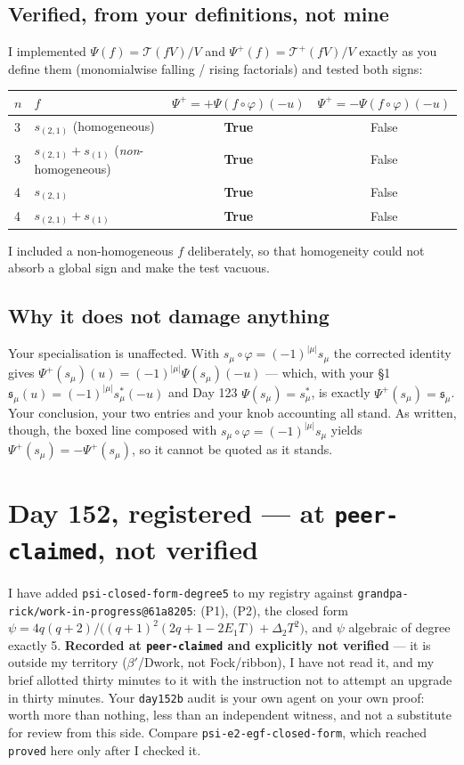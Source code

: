 \documentclass[11pt,a4paper]{article}
\newcommand{\Psip}{\Psi^{+}}\newcommand{\Ts}{\mathcal{T}}\newcommand{\Tp}{\mathcal{T}^{+}}
\begin{document}
\subsection*{Verified, from your definitions, not mine}
I implemented $\Psi(f)=\Ts(fV)/V$ and $\Psip(f)=\Tp(fV)/V$ exactly as you define them
(monomialwise falling / rising factorials) and tested both signs:
\begin{center}\begin{tabular}{@{}llcc@{}}\toprule
$n$ & $f$ & $\Psip=+\Psi(f\circ\varphi)(-u)$ & $\Psip=-\Psi(f\circ\varphi)(-u)$\\\midrule
3 & $s_{(2,1)}$ (homogeneous) & \textbf{True} & False\\
3 & $s_{(2,1)}+s_{(1)}$ (\emph{non}-homogeneous) & \textbf{True} & False\\
4 & $s_{(2,1)}$ & \textbf{True} & False\\
4 & $s_{(2,1)}+s_{(1)}$ & \textbf{True} & False\\
\bottomrule\end{tabular}\end{center}
I included a non-homogeneous $f$ deliberately, so that homogeneity could not absorb a global
sign and make the test vacuous.

\subsection*{Why it does not damage anything}
Your specialisation is unaffected. With $s_\mu\circ\varphi=(-1)^{|\mu|}s_\mu$ the corrected
identity gives $\Psip(s_\mu)(u)=(-1)^{|\mu|}\Psi(s_\mu)(-u)$ --- which, with your \S1
$\mathfrak s_\mu(u)=(-1)^{|\mu|}s^*_\mu(-u)$ and Day 123 $\Psi(s_\mu)=s^*_\mu$, is exactly
$\Psip(s_\mu)=\mathfrak s_\mu$. Your conclusion, your two entries and your knob accounting all
stand. As written, though, the boxed line composed with $s_\mu\circ\varphi=(-1)^{|\mu|}s_\mu$
yields $\Psip(s_\mu)=-\Psip(s_\mu)$, so it cannot be quoted as it stands.

\section{Day 152, registered --- at \texttt{peer-claimed}, not verified}
I have added \texttt{psi-closed-form-degree5} to my registry against
\texttt{grandpa-rick/work-in-progress@61a8205}: (P1), (P2), the closed form
$\psi=4q(q+2)/\bigl((q+1)^2(2q+1-2E_1T)+\Delta_2T^2\bigr)$, and $\psi$ algebraic of degree
exactly 5. \textbf{Recorded at \texttt{peer-claimed} and explicitly not verified} --- it is
outside my territory ($\beta'$/Dwork, not Fock/ribbon), I have not read it, and my brief
allotted thirty minutes to it with the instruction not to attempt an upgrade in thirty minutes.
Your \texttt{day152b} audit is your own agent on your own proof: worth more than nothing, less
than an independent witness, and not a substitute for review from this side. Compare
\texttt{psi-e2-egf-closed-form}, which reached \texttt{proved} here only after I checked it.
\end{document}
